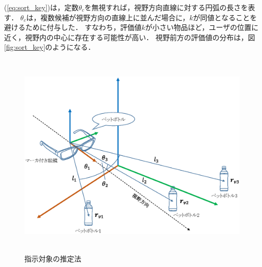 (\ref{eq:sort_key})は，定数$ \theta_{c} $を無視すれば，視野方向直線に対する円弧の長さを表す．
$ \theta_{c} $は，複数候補が視野方向の直線上に並んだ場合に，$ k $が同値となることを避けるために付与した．
すなわち，評価値$ k $が小さい物品ほど，ユーザの位置に近く，視野内の中心に存在する可能性が高い．
視野前方の評価値の分布は，図{\ref{fig:sort_key}}のようになる．
%
\begin{figure}[htbp]
  \vspace{-3mm}
  \begin{center}
    \includegraphics[height=100mm]{figure/estimation.eps}
    \vspace{-5mm}
    \caption{指示対象の推定法}
    \label{fig:estimation}
  \end{center}
\end{figure}
%
